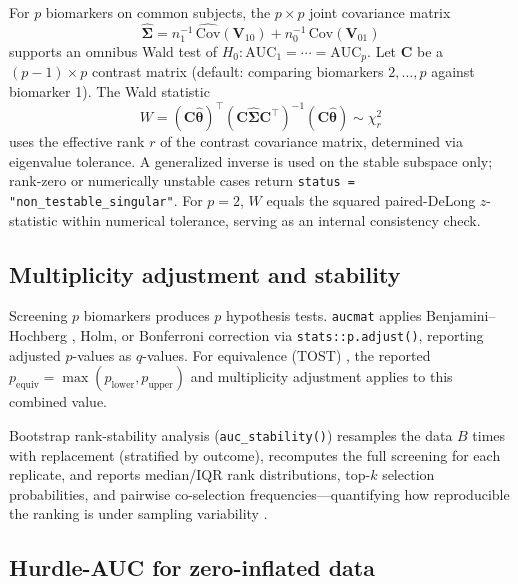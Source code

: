 \documentclass[11pt,a4paper]{article}
\begin{document}
For $p$ biomarkers on common subjects, the $p \times p$ joint covariance
matrix
\begin{equation}\label{eq:joint_cov}
\widehat{\bm{\Sigma}} = n_1^{-1}\,\widehat{\text{Cov}}(\mathbf{V}_{10})
+ n_0^{-1}\,\widehat{\text{Cov}}(\mathbf{V}_{01})
\end{equation}
supports an omnibus Wald test of
$H_0: \text{AUC}_1 = \cdots = \text{AUC}_p$.
Let $\mathbf{C}$ be a $(p-1) \times p$ contrast matrix (default: comparing
biomarkers $2,\ldots,p$ against biomarker 1).  The Wald statistic
\begin{equation}\label{eq:wald}
W = (\mathbf{C}\hat{\bm{\theta}})^\top
(\mathbf{C}\widehat{\bm{\Sigma}}\mathbf{C}^\top)^{-1}
(\mathbf{C}\hat{\bm{\theta}}) \sim \chi^2_{r}
\end{equation}
uses the effective rank $r$ of the contrast covariance matrix, determined
via eigenvalue tolerance.  A generalized inverse is used on the stable
subspace only; rank-zero or numerically unstable cases return
\texttt{status = "non\_testable\_singular"}.  For $p = 2$, $W$ equals the
squared paired-DeLong $z$-statistic within numerical tolerance, serving as
an internal consistency check.

\subsection{Multiplicity adjustment and stability}

Screening $p$ biomarkers produces $p$ hypothesis tests.
\texttt{aucmat} applies Benjamini--Hochberg \citep{Benjamini1995}, Holm, or
Bonferroni correction via \texttt{stats::p.adjust()}, reporting adjusted
$p$-values as $q$-values.  For equivalence (TOST) \citep{Schuirmann1987},
the reported $p_{\text{equiv}} = \max(p_{\text{lower}}, p_{\text{upper}})$
and multiplicity adjustment applies to this combined value.

Bootstrap rank-stability analysis (\texttt{auc\_stability()}) resamples the
data $B$ times with replacement (stratified by outcome), recomputes the full
screening for each replicate, and reports median/IQR rank distributions,
top-$k$ selection probabilities, and pairwise co-selection
frequencies---quantifying how reproducible the ranking is under sampling
variability \citep{Efron1994}.

\subsection{Hurdle-AUC for zero-inflated data}
\end{document}
